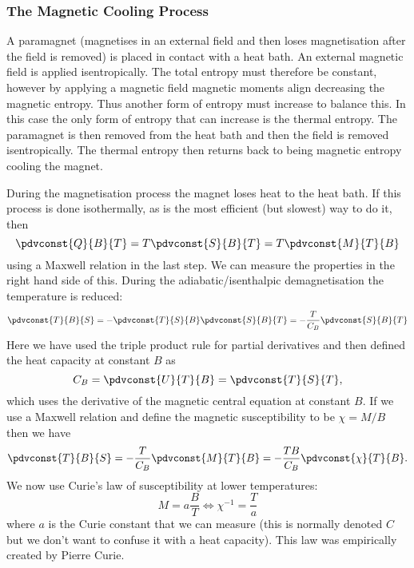     \subsubsection{The Magnetic Cooling Process}
    A paramagnet (magnetises in an external field and then loses magnetisation after the field is removed) is placed in contact with a heat bath.
    An external magnetic field is applied isentropically.
    The total entropy must therefore be constant, however by applying a magnetic field magnetic moments align decreasing the magnetic entropy.
    Thus another form of entropy must increase to balance this.
    In this case the only form of entropy that can increase is the thermal entropy.
    The paramagnet is then removed from the heat bath and then the field is removed isentropically.
    The thermal entropy then returns back to being magnetic entropy cooling the magnet.
    
    During the magnetisation process the magnet loses heat to the heat bath.
    If this process is done isothermally, as is the most efficient (but slowest) way to do it, then
    \[\pdvconst{Q}{B}{T} = T\pdvconst{S}{B}{T} = T\pdvconst{M}{T}{B}\]
    using a Maxwell relation in the last step.
    We can measure the properties in the right hand side of this.
    During the adiabatic/isenthalpic demagnetisation the temperature is reduced:
    \[\pdvconst{T}{B}{S} = -\pdvconst{T}{S}{B}\pdvconst{S}{B}{T} = -\frac{T}{C_B}\pdvconst{S}{B}{T}\]
    Here we have used the triple product rule for partial derivatives and then defined the heat capacity at constant \(B\) as
    \[C_B = \pdvconst{U}{T}{B} = \pdvconst{T}{S}{T},\]
    which uses the derivative of the magnetic central equation at constant \(B\).
    If we use a Maxwell relation and define the magnetic susceptibility to be \(\chi = M/B\) then we have
    \begin{equation}\label{eqn:dT/dB const S}
        \pdvconst{T}{B}{S} = -\frac{T}{C_B}\pdvconst{M}{T}{B} = -\frac{TB}{C_B}\pdvconst{\chi}{T}{B}.
    \end{equation}
    We now use Curie's law of susceptibility at lower temperatures:
    \[M = a\frac{B}{T} \iff \chi^{-1} = \frac{T}{a}\]
    where \(a\) is the Curie constant that we can measure (this is normally denoted \(C\) but we don't want to confuse it with a heat capacity).
    This law was empirically created by Pierre Curie.
    
